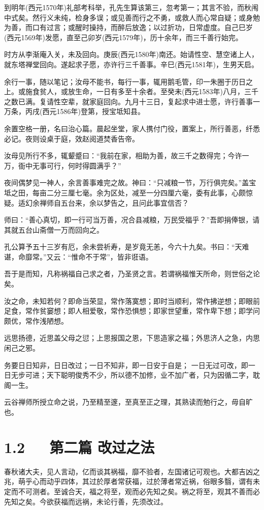 \documentclass[letterpaper,12pt,english]{sphinxmanual}
\begin{document}
到明年(西元1570年)礼部考科举，孔先生算该第三，忽考第一；其言不验，而秋闱中式矣。然行义未纯，检身多误；或见善而行之不勇，或救人而心常自疑；或身勉为善，而口有过言；或醒时操持，而醉后放逸；以过折功，日常虚度。自己巳岁(西元1569年)发愿，直至己卯岁(西元1579年)，历十余年，而三千善行始完。

时方从李渐庵入关，未及回向。庚辰(西元1580年)南还。始请性空、慧空诸上人，就东塔禅堂回向。遂起求子愿，亦许行三千善事。辛巳(西元1581年)，生男天启。

余行一事，随以笔记；汝母不能书，每行一事，辄用鹅毛管，印一朱圈于历日之上。或施食贫人，或放生命，一日有多至十余者。至癸未(西元1583年)八月，三千之数已满。复请性空辈，就家庭回向。九月十三日，复起求中进士愿，许行善事一万条，丙戌(西元1586年)登第，授宝坻知县。

余置空格一册，名曰治心篇。晨起坐堂，家人携付门役，置案上，所行善恶，纤悉必记。夜则设桌于庭，效赵阅道焚香告帝。

汝母见所行不多，辄颦蹙曰：“我前在家，相助为善，故三千之数得完；今许一万，衙中无事可行，何时得圆满乎？”

夜间偶梦见一神人，余言善事难完之故。神曰：“只减粮一节，万行俱完矣。”盖宝坻之田，每亩二分三厘七毫。余为区处，减至一分四厘六毫，委有此事，心颇惊疑。适幻余禅师自五台来，余以梦告之，且问此事宜信否？

师曰：“善心真切，即一行可当万善，况合县减粮，万民受福乎？”吾即捐俸银，请其就五台山斋僧一万而回向之。

孔公算予五十三岁有厄，余未尝祈寿，是岁竟无恙，今六十九矣。书曰：“天难谌，命靡常。”又云：“惟命不于常”，皆非诳语。

吾于是而知，凡称祸福自己求之者，乃圣贤之言。若谓祸福惟天所命，则世俗之论矣。

汝之命，未知若何？即命当荣显，常作落寞想；即时当顺利，常作拂逆想；即眼前足食，常作贫窭想；即人相爱敬，常作恐惧想；即家世望重，常作卑下想；即学问颇优，常作浅陋想。

远思扬德，近思盖父母之愆；上思报国之恩，下思造家之福；外思济人之急，内思闲己之邪。

务要日日知非，日日改过；一日不知非，即一日安于自是； 一日无过可改，即一日无步可进；天下聪明俊秀不少，所以德不加修，业不加广者，只为因循二字，耽阁一生。

云谷禅师所授立命之说，乃至精至邃，至真至正之理，其熟读而勉行之，毋自旷也。


\section{1.2   第二篇 改过之法}
\label{\detokenize{p00_u5176_u5b83/_u8881_u4e86_u51e1-_u4e86_u51e1_u56db_u8bad:id4}}
春秋诸大夫，见人言动，亿而谈其祸福，靡不验者，左国诸记可观也。大都吉凶之兆，萌乎心而动乎四体，其过於厚者常获福，过於薄者常近祸，俗眼多翳，谓有未定而不可测者。至诚合天，福之将至，观而必先知之矣。祸之将至，观其不善而必先知之矣。今欲获福而远祸，未论行善，先须改过。
\end{document}
